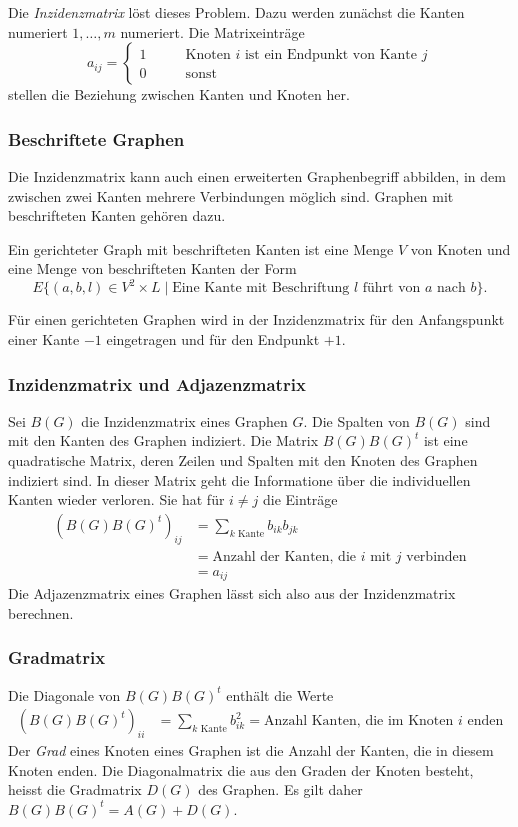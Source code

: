 Die {\em Inzidenzmatrix} löst dieses Problem.
Dazu werden zunächst die Kanten numeriert $1,\dots,m$
numeriert.
Die Matrixeinträge
\[
a_{ij} = \begin{cases}
1\qquad&\text{Knoten $i$ ist ein Endpunkt von Kante $j$}
\\
0\qquad&\text{sonst}
\end{cases}
\]
stellen die Beziehung zwischen Kanten und Knoten her.

\subsubsection{Beschriftete Graphen}
Die Inzidenzmatrix kann auch einen erweiterten Graphenbegriff abbilden,
in dem zwischen zwei Kanten mehrere Verbindungen möglich sind.
Graphen mit beschrifteten Kanten gehören dazu.

\begin{definition}
Ein gerichteter Graph mit beschrifteten Kanten ist eine Menge $V$ von 
Knoten und eine Menge von beschrifteten Kanten der Form
\[
E \{ (a,b,l)\in V^2\times L\;|\; \text{Eine Kante mit Beschriftung $l$ führt von $a$ nach $b$}\}.
\]
\end{definition}

Für einen gerichteten Graphen wird in der Inzidenzmatrix für
den Anfangspunkt einer Kante $-1$ eingetragen und für den
Endpunkt $+1$.

\subsubsection{Inzidenzmatrix und Adjazenzmatrix}
Sei $B(G)$ die Inzidenzmatrix eines Graphen $G$. 
Die Spalten von $B(G)$ sind mit den Kanten des Graphen indiziert.
Die Matrix $B(G)B(G)^t$ ist eine quadratische Matrix, deren
Zeilen und Spalten mit den Knoten des Graphen indiziert sind.
In dieser Matrix geht die Informatione über die individuellen
Kanten wieder verloren.
Sie hat für $i\ne j$ die Einträge
\begin{align*}
(B(G)B(G)^t)_{ij}
&=
\sum_{\text{$k$ Kante}} b_{ik}b_{jk}
\\
&=\text{Anzahl der Kanten, die $i$ mit $j$ verbinden}
\\
&=a_{ij}
\end{align*}
Die Adjazenzmatrix eines Graphen lässt sich also aus der
Inzidenzmatrix berechnen.

\subsubsection{Gradmatrix}
Die Diagonale von $B(G)B(G)^t$ enthält die Werte
\begin{align*}
(B(G)B(G)^t)_{ii}
&=
\sum_{\text{$k$ Kante}} b_{ik}^2
=
\text{Anzahl Kanten, die im Knoten $i$ enden}
\end{align*}
Der {\em Grad} eines Knoten eines Graphen ist die Anzahl der
%
Kanten, die in diesem Knoten enden.
Die Diagonalmatrix die aus den Graden der Knoten besteht, heisst die
Gradmatrix $D(G)$ des Graphen.
Es gilt daher $B(G)B(G)^t = A(G) + D(G)$.


